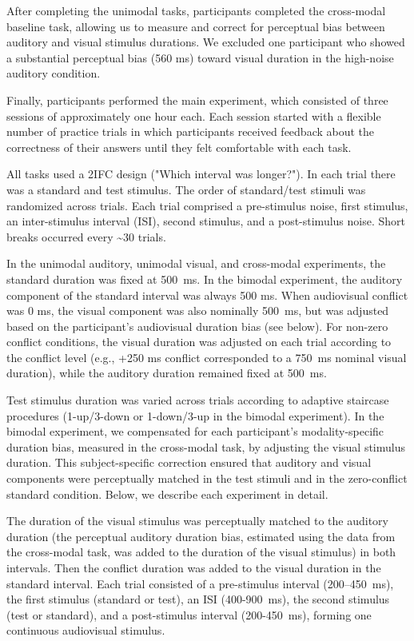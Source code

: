 \documentclass[9pt,lineno,doublespacing]{elife}
\begin{document}
After completing the unimodal tasks, participants completed the cross-modal baseline task, allowing us to measure and correct for perceptual bias between auditory and visual stimulus durations. We excluded one participant who showed a substantial perceptual bias (560 ms) toward visual duration in the high-noise auditory condition. 


Finally, participants performed the main experiment, which consisted of three sessions of approximately one hour each. Each session started with a flexible number of practice trials in which participants received feedback about the correctness of their answers until they felt comfortable with each task.

All tasks used a 2IFC design ("Which interval was longer?"). In each trial there was a standard and test stimulus. The order of standard/test stimuli was randomized across trials. Each trial comprised a pre-stimulus noise, first stimulus, an inter-stimulus interval (ISI), second stimulus, and a post-stimulus noise. Short breaks occurred every \textasciitilde 30 trials.

In the unimodal auditory, unimodal visual, and cross-modal experiments, the standard duration was fixed at 500~ms. In the bimodal experiment, the auditory component of the standard interval was always 500 ms. When audiovisual conflict was 0 ms, the visual component was also nominally 500~ms, but was adjusted based on the participant's audiovisual duration bias (see below). For non-zero conflict conditions, the visual duration was adjusted on each trial according to the conflict level (e.g., +250 ms conflict corresponded to a 750~ms nominal visual duration), while the auditory duration remained fixed at 500~ms.

Test stimulus duration was varied across trials according to adaptive staircase procedures (1-up/3-down or 1-down/3-up in the bimodal experiment). In the bimodal experiment, we compensated for each participant’s modality-specific duration bias, measured in the cross-modal task, by adjusting the visual stimulus duration. This subject-specific correction ensured that auditory and visual components were perceptually matched in the test stimuli and in the zero-conflict standard condition. Below, we describe each experiment in detail.


The duration of the visual stimulus was perceptually matched to the auditory duration (the perceptual auditory duration bias, estimated using the data from the cross-modal task, was added to the duration of the visual stimulus) in both intervals. Then the conflict duration was added to the visual duration in the standard interval. Each trial consisted of a pre-stimulus interval (200–450~ms), the first stimulus (standard or test), an ISI (400-900~ms), the second stimulus (test or standard), and a post-stimulus interval (200-450~ms), forming one continuous audiovisual stimulus.
\end{document}
